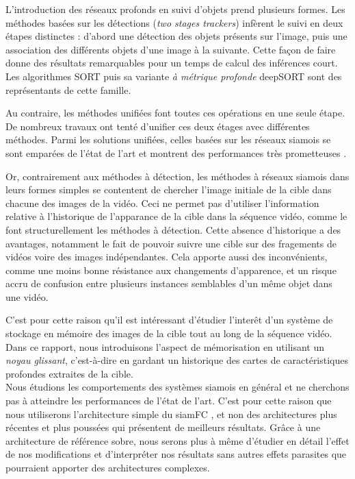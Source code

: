 \documentclass[10pt,twocolumn,letterpaper,french]{article}
\begin{document}
   L'introduction des réseaux profonds en suivi d'objets prend plusieurs formes. Les méthodes basées sur les détections (\textit{two stages trackers}) infèrent le suivi en deux étapes distinctes : d'abord une détection des objets présents sur l'image, puis une association des différents objets d'une image à la suivante. Cette façon de faire donne des résultats remarquables pour un temps de calcul des inférences court. Les algorithmes SORT \cite{SORT} puis sa variante \textit{à métrique profonde} deepSORT \cite{deepSORT} sont des représentants de cette famille.
   
   Au contraire, les méthodes unifiées font toutes ces opérations en une seule étape. De nombreux travaux ont tenté d'unifier ces deux étages avec différentes méthodes. Parmi les solutions unifiées, celles basées sur les réseaux siamois se sont emparées de l'état de l'art et montrent des performances très prometteuses \cite{siamfc, siamfcplusplus, siamMask}. 
   
   Or, contrairement aux méthodes à détection, les méthodes à réseaux siamois dans leurs formes simples se contentent de chercher l'image initiale de la cible dans chacune des images de la vidéo. Ceci ne permet pas d'utiliser l'information relative à l'historique de l'apparance de la cible dans la séquence vidéo, comme le font structurellement les méthodes à détection. Cette absence d'historique a des avantages, notamment le fait de pouvoir suivre une cible sur des fragements de vidéos voire des images indépendantes. Cela apporte aussi des inconvénients, comme une moins bonne résistance aux changements d'apparence, et un risque accru de confusion entre plusieurs instances semblables d'un même objet dans une vidéo.
   
   C'est pour cette raison qu'il est intéressant d'étudier l'interêt d'un système de stockage en mémoire des images de la cible tout au long de la séquence vidéo. Dans ce rapport, nous introduisons l'aspect de mémorisation en utilisant un \textit{noyau glissant}, c'est-à-dire en gardant un historique des cartes de caractéristiques profondes extraites de la cible.\\
  
  Nous étudions les comportements des systèmes siamois en général et ne cherchons pas à atteindre les performances de l'état de l'art. C'est pour cette raison que nous utiliserons l'architecture simple du siamFC \cite{siamfc}, et non des architectures plus récentes et plus poussées qui présentent de meilleurs résultats. Grâce à une architecture de référence sobre, nous serons plus à même d'étudier en détail l'effet de nos modifications et d'interpréter nos résultats sans autres effets parasites que pourraient apporter des architectures complexes.
\end{document}
